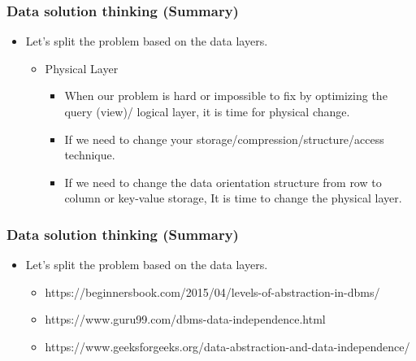 \begin{frame}
    \frametitle{Data solution thinking (Summary) }
    \begin{itemize}[<+->]
        \item Let's split the problem based on the data layers.
        \begin{itemize}[<+->]
            \item Physical Layer
            \begin{itemize}[<+->]
                \item When our problem is hard or impossible to fix by optimizing the query (view)/ logical layer, it is time for physical change.
                \item If we need to change your storage/compression/structure/access technique.
                \item If we need to change the data orientation structure from row to column or key-value storage, It is time to change the physical layer.
            \end{itemize}
        \end{itemize}
    \end{itemize}
\end{frame}

\begin{frame}
    \frametitle{Data solution thinking (Summary) }
    \begin{itemize}[<+->]
        \item Let's split the problem based on the data layers.
        \begin{itemize}[<+->]
            \item https://beginnersbook.com/2015/04/levels-of-abstraction-in-dbms/
            \item https://www.guru99.com/dbms-data-independence.html
            \item https://www.geeksforgeeks.org/data-abstraction-and-data-independence/
        \end{itemize}
    \end{itemize}
    \end{frame}


